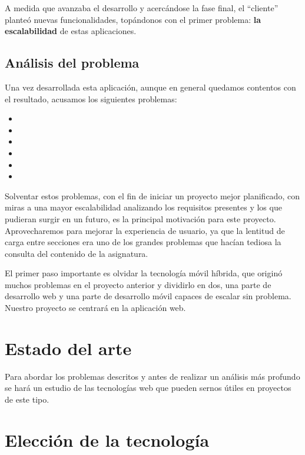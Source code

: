 A medida que avanzaba el desarrollo  y acercándose la fase final, el ``cliente'' planteó nuevas funcionalidades, topándonos con el primer problema: \textbf{la escalabilidad} de estas aplicaciones.



\subsection{Análisis del problema}
Una vez desarrollada esta aplicación, aunque en general quedamos contentos con el resultado, acusamos los siguientes problemas:

\begin{itemize}
  \item {}
  \item {}
  \item {}
  \item {}
  \item {}
  \item {}
\end{itemize}

\bigskip 
Solventar estos problemas, con el fin de iniciar un proyecto mejor planificado, con miras a una mayor escalabilidad analizando los requisitos presentes y los que pudieran surgir en un futuro, es la principal motivación para este proyecto. Aprovecharemos para mejorar la experiencia de usuario, ya que la lentitud de carga entre secciones era uno de los grandes problemas que hacían tediosa la consulta del contenido de la asignatura.

\bigskip
El primer paso importante es olvidar la tecnología móvil híbrida, que originó muchos problemas en el proyecto anterior y dividirlo en dos, una parte de desarrollo web y una parte de desarrollo móvil capaces de escalar sin problema. Nuestro proyecto se centrará en la aplicación web.


\section{Estado del arte}
Para abordar los problemas descritos y antes de realizar un análisis más profundo se hará un estudio de las tecnologías web que pueden sernos útiles en proyectos de este tipo.


\section{Elección de la tecnología}